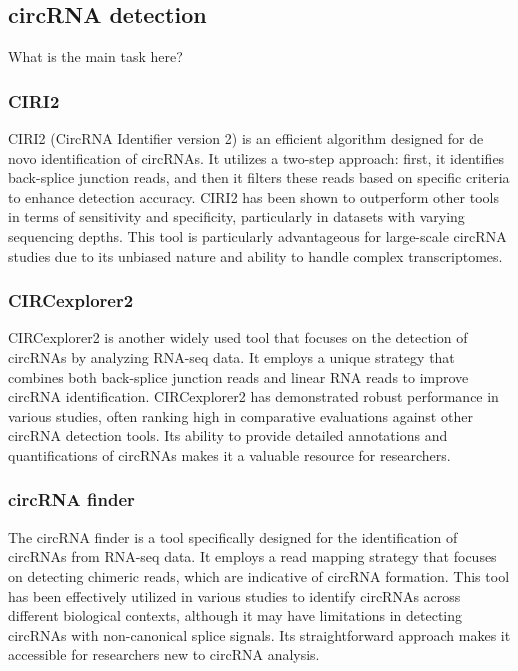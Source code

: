 \subsection{circRNA detection}
What is the main task here?

\subsubsection{CIRI2}
CIRI2 (CircRNA Identifier version 2) is an efficient algorithm designed for de
novo identification of circRNAs.
It utilizes a two-step approach: first, it identifies back-splice junction
reads, and then it filters these reads based on specific criteria to enhance
detection accuracy.
CIRI2 has been shown to outperform other tools in terms of sensitivity and
specificity, particularly in datasets with varying sequencing
depths\supercite{gao_ciri_2015,zheng_reconstruction_2019}.
This tool is particularly advantageous for large-scale circRNA studies due to
its unbiased nature and ability to handle complex
transcriptomes\supercite{chuang_assessing_2023}.

\subsubsection{CIRCexplorer2}
CIRCexplorer2 is another widely used tool that focuses on the detection of
circRNAs by analyzing RNA-seq data.
It employs a unique strategy that combines both back-splice junction reads and
linear RNA reads to improve circRNA identification.
CIRCexplorer2 has demonstrated robust performance in various studies, often
ranking high in comparative evaluations against other circRNA detection
tools\supercite{zeng_comprehensive_2017,nicolet_circular_2018}.
Its ability to provide detailed annotations and quantifications of circRNAs
makes it a valuable resource for researchers\supercite{hansen_comparison_2016}.

\subsubsection{circRNA finder}
The circRNA finder is a tool specifically designed for the identification of
circRNAs from RNA-seq data.
It employs a read mapping strategy that focuses on detecting chimeric reads,
which are indicative of circRNA formation.
This tool has been effectively utilized in various studies to identify circRNAs
across different biological contexts, although it may have limitations in
detecting circRNAs with non-canonical splice
signals\supercite{sekar_circular_2018,liu_prkra_2022}.
Its straightforward approach makes it accessible for researchers new to circRNA
analysis.

